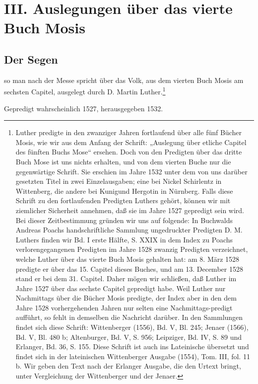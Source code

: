 \part{III. Auslegungen über das vierte Buch Mosis}

\chapter{Der Segen}

\begin{center}
so man nach der Messe spricht über das Volk, aus dem vierten Buch Mosis am sechsten Capitel, ausgelegt durch D. Martin Luther.\footnote{Luther predigte in den zwanziger Jahren fortlaufend über alle fünf Bücher Mosis, wie wir aus dem Anfang der Schrift: „Auslegung über etliche Capitel des fünften Buchs Mose“ ersehen. Doch von den Predigten über das dritte Buch Mose ist uns nichts erhalten, und von dem vierten Buche nur die gegenwärtige Schrift. Sie erschien im Jahre 1532 unter dem von uns darüber gesetzten Titel in zwei Einzelausgaben; eine bei Nickel Schirlentz in Wittenberg, die andere bei Kunigund Hergotin in Nürnberg. Falls diese Schrift zu den fortlaufenden Predigten Luthers gehört, können wir mit ziemlicher Sicherheit annehmen, daß sie im Jahre 1527 gepredigt sein wird. Bei dieser Zeitbestimmung gründen wir uns auf folgende: In Buchwalds Andreas Poachs handschriftliche Sammlung ungedruckter Predigten D. M. Luthers finden wir Bd. I erste Hälfte, S. XXIX in dem Index zu Poachs verlorengegangenen Predigten im Jahre 1528 zwanzig Predigten verzeichnet, welche Luther über das vierte Buch Mosis gehalten hat: am 8. März 1528 predigte er über das 15. Capitel dieses Buches, und am 13. December 1528 stand er bei dem 31. Capitel. Daher mögen wir schließen, daß Luther im Jahre 1527 über das sechste Capitel gepredigt habe. Weil Luther nur Nachmittags über die Bücher Mosis predigte, der Index aber in den dem Jahre 1528 vorhergehenden Jahren nur selten eine Nachmittags-predigt aufführt, so fehlt in demselben die Nachricht darüber. In den Sammlungen findet sich diese Schrift: Wittenberger (1556), Bd. V, Bl. 245; Jenaer (1566), Bd. V, Bl. 480 b; Altenburger, Bd. V, S. 956; Leipziger, Bd. IV, S. 89 und Erlanger, Bd. 36, S. 155. Diese Schrift ist auch ins Lateinische übersetzt und findet sich in der lateinischen Wittenberger Ausgabe (1554), Tom. III, fol. 11 b. Wir geben den Text nach der Erlanger Ausgabe, die den Urtext bringt, unter Vergleichung der Wittenberger und der Jenaer.}

Gepredigt wahrscheinlich 1527, herausgegeben 1532.
\end{center}

